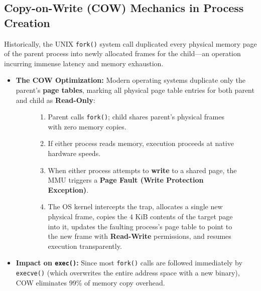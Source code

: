 \subsection{Copy-on-Write (COW) Mechanics in Process Creation}
Historically, the UNIX \texttt{fork()} system call duplicated every physical memory page of the parent process into newly allocated frames for the child—an operation incurring immense latency and memory exhaustion.
\begin{itemize}
    \item \textbf{The COW Optimization:} Modern operating systems duplicate only the parent's \textbf{page tables}, marking all physical page table entries for both parent and child as \textbf{Read-Only}:
    \begin{figure}[htbp]
    \centering
    \begin{tcolorbox}[colback=codebg, colframe=primary, title=\textbf{Copy-on-Write Operational Lifecycle}]
    \begin{enumerate}
        \item Parent calls \texttt{fork()}; child shares parent's physical frames with zero memory copies.
        \item If either process reads memory, execution proceeds at native hardware speeds.
        \item When either process attempts to \textbf{write} to a shared page, the MMU triggers a \textbf{Page Fault (Write Protection Exception)}.
        \item The OS kernel intercepts the trap, allocates a single new physical frame, copies the $4\text{ KiB}$ contents of the target page into it, updates the faulting process's page table to point to the new frame with \textbf{Read-Write} permissions, and resumes execution transparently.
    \end{enumerate}
    \end{tcolorbox}
    \end{figure}
    \item \textbf{Impact on \texttt{exec()}:} Since most \texttt{fork()} calls are followed immediately by \texttt{execve()} (which overwrites the entire address space with a new binary), COW eliminates 99\% of memory copy overhead.
\end{itemize}

